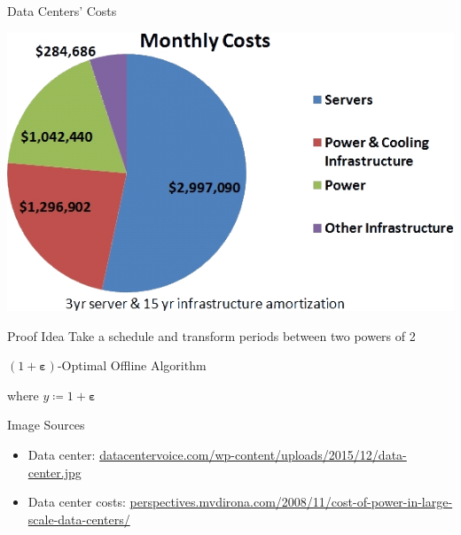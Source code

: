 \documentclass{beamer}
\newcommand{\beps}{\boldsymbol\varepsilon}
\begin{document}
\begin{frame}{Data Centers' Costs}

\vspace{0.5\baselineskip}
\centering\includegraphics[height=0.5\textheight]{img/data_center_costs.jpg}
\end{frame}
\begin{frame}{Proof Idea}
\centering Take a schedule and transform periods between two powers of 2

\pause\begin{figure}
	
\end{figure}
\end{frame}
\begin{frame}{$(1+\beps)$-Optimal Offline Algorithm}
\begin{figure}
	
\end{figure}
\centering where $y\coloneqq1+\beps$
\end{frame}
\begin{frame}[allowframebreaks]{Image Sources}
\begin{itemize}
\item Data center: \url{datacentervoice.com/wp-content/uploads/2015/12/data-center.jpg}
\item Data center costs: \url{perspectives.mvdirona.com/2008/11/cost-of-power-in-large-scale-data-centers/}
\end{itemize}
\end{frame}
\end{document}
